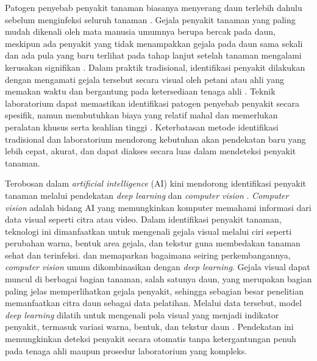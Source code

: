 Patogen penyebab penyakit tanaman biasanya menyerang daun terlebih dahulu sebelum menginfeksi seluruh tanaman \parencite{sharmaClassificationPlantLeaf2020}. Gejala penyakit tanaman yang paling mudah dikenali oleh mata manusia umumnya berupa bercak pada daun, meskipun ada penyakit yang tidak menampakkan gejala pada daun sama sekali dan ada pula yang baru terlihat pada tahap lanjut setelah tanaman mengalami kerusakan signifikan \parencite{upadhyayDeepLearningComputer2025}. Dalam praktik tradisional, identifikasi penyakit dilakukan dengan mengamati gejala tersebut secara visual oleh petani atau ahli yang memakan waktu dan bergantung pada ketersediaan tenaga ahli \parencite{bhargavaPlantLeafDisease2024}. Teknik laboratorium dapat memastikan identifikasi patogen penyebab penyakit secara spesifik, namun membutuhkan biaya yang relatif mahal dan memerlukan peralatan khusus serta keahlian tinggi \parencite[Sahu dkk., 2021 dalam][]{upadhyayDeepLearningComputer2025}. Keterbatasan metode identifikasi tradisional dan laboratorium mendorong kebutuhan akan pendekatan baru yang lebih cepat, akurat, dan dapat diakses secara luas dalam mendeteksi penyakit tanaman.

Terobosan dalam \textit{artificial intelligence} (AI) kini mendorong identifikasi penyakit tanaman melalui pendekatan \textit{deep learning} dan \textit{computer vision} \parencite{upadhyayDeepLearningComputer2025}. \textit{Computer vision} adalah bidang AI yang memungkinkan komputer memahami informasi dari data visual seperti citra atau video. Dalam identifikasi penyakit tanaman, teknologi ini dimanfaatkan untuk mengenali gejala visual melalui ciri seperti perubahan warna, bentuk area gejala, dan tekstur guna membedakan tanaman sehat dan terinfeksi. \textcite{bhargavaPlantLeafDisease2024} dan \textcite{upadhyayDeepLearningComputer2025} memaparkan bagaimana seiring perkembangannya, \textit{computer vision} umum dikombinasikan dengan \textit{deep learning}. Gejala visual dapat muncul di berbagai bagian tanaman, salah satunya daun, yang merupakan bagian paling jelas memperlihatkan gejala penyakit, sehingga sebagian besar penelitian memanfaatkan citra daun sebagai data pelatihan. Melalui data tersebut, model \textit{deep learning} dilatih untuk mengenali pola visual yang menjadi indikator penyakit, termasuk variasi warna, bentuk, dan tekstur daun \parencite{ramanjotPlantDiseaseDetection2023}. Pendekatan ini memungkinkan deteksi penyakit secara otomatis tanpa ketergantungan penuh pada tenaga ahli maupun prosedur laboratorium yang kompleks.

